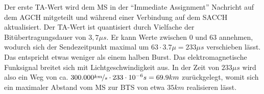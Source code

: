 Der erste \ac{TA}-Wert wird dem \ac{MS} in der "`Immediate Assignment"' Nachricht auf dem \ac{AGCH} mitgeteilt und während einer Verbindung auf dem \ac{SACCH} aktualisiert. Der \ac{TA}-Wert ist quantisiert durch Vielfache der Bitübertragungsdauer von $3,7\mu s$. Er kann Werte zwischen 0 und 63 annehmen, wodurch sich der Sendezeitpunkt maximal um $63 \cdot 3.7\mu = 233\mu s$ verschieben lässt. Das entspricht etwas weniger als einem halben Burst. Das elektromagnetische Funksignal breitet sich mit Lichtgeschwindigkeit aus. In der Zeit von $233\mu s$ wird also ein Weg von ca. $300.000 \nicefrac{km}{s} \cdot 233 \cdot 10^{-6} s = 69.9 km$ zurückgelegt, womit sich ein maximaler Abstand vom \ac{MS} zur \ac{BTS} von etwa $35km$ realisieren lässt.
